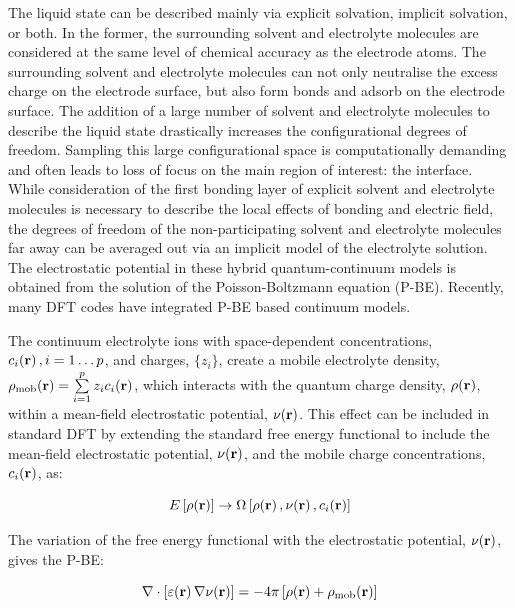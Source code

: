 \documentclass[../main.tex]{subfiles}
\begin{document}
The liquid state can be described mainly via explicit solvation,\cite{Hansen2016} implicit solvation,\cite{Sakong2015} or both.\cite{Skyner2015} In the former, the surrounding solvent and electrolyte molecules are considered at the same level of chemical accuracy as the electrode atoms. The surrounding solvent and electrolyte molecules can not only neutralise the excess charge on the electrode surface, but also form bonds and adsorb on the electrode surface.\cite{Kang2011,Dufils2019, Jorn2013} The addition of a large number of solvent and electrolyte molecules to describe the liquid state drastically increases the configurational degrees of freedom. Sampling this large configurational space is computationally demanding and often leads to loss of focus on the main region of interest: the interface. While consideration of the first bonding layer of explicit solvent and electrolyte molecules is necessary to describe the local effects of bonding and electric field,\cite{Zhang2020} the degrees of freedom of the non-participating solvent and electrolyte molecules far away can be averaged out via an implicit model of the electrolyte solution.\cite{Cramer1999, Tomasi2005} The electrostatic potential in these hybrid quantum-continuum models is obtained from the solution of the Poisson-Boltzmann equation (P-BE).\cite{Grochowski2008} Recently, many DFT codes have integrated P-BE based continuum models.\cite{Jinnouchi2008, Gunceler2013, Ringe2016, Nattino2019, Melander2019, Stein2019, DLMG2018, Dziedzic2020, neutralization-paper}

The continuum electrolyte ions with space-dependent concentrations, $c_i\!\left(\mathbf{r}\right), i=1\dots p$, and charges, $\{z_i\}$, create a mobile electrolyte density, $\rho_{\textrm{mob}}\!\left(\mathbf{r}\right)=\sum\limits_{i=1}^p z_ic_i\!\left(\mathbf{r}\right)$, which interacts with the quantum charge density, $\rho\!\left(\mathbf{r}\right)$, within a mean-field electrostatic potential, $\nu\!\left(\mathbf{r}\right)$. This effect can be included in standard DFT by extending the standard free energy functional to include the mean-field electrostatic potential, $\nu\!\left(\mathbf{r}\right)$, and the mobile charge concentrations, $c_i\!\left(\mathbf{r}\right)$, as:\cite{Dziedzic2020}

\begin{equation}
    E\left[\rho\!\left(\mathbf{r}\right)\right]\rightarrow \Omega\left[\rho\!\left(\mathbf{r}\right),\nu\!\left(\mathbf{r}\right),c_i\!\left(\mathbf{r}\right)\right]
\end{equation}

The variation of the free energy functional with the electrostatic potential, $\nu\!\left(\mathbf{r}\right)$, gives the P-BE:

\begin{equation}
    \label{eq:pbe}
    \nabla\cdot\left[\varepsilon\!\left(\mathbf{r}\right)\nabla\nu\!\left(\mathbf{r}\right)\right]=-4\pi\left[\rho\!\left(\mathbf{r}\right)+\rho_{\textrm{mob}}\!\left(\mathbf{r}\right)\right]
\end{equation}
\end{document}
